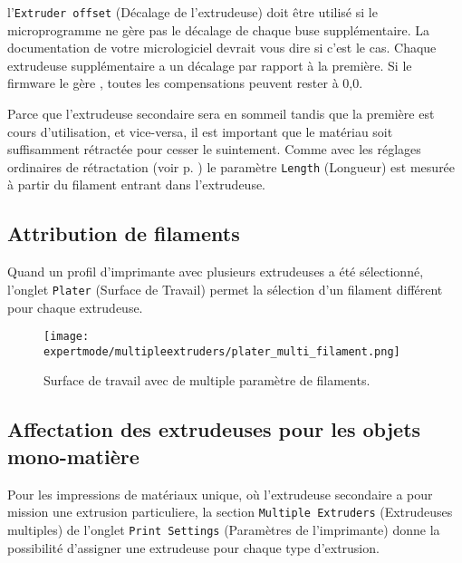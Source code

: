 
l'\texttt{Extruder offset} (Décalage de l'extrudeuse) doit être utilisé si le microprogramme ne gère pas le décalage de chaque buse supplémentaire. La documentation de votre micrologiciel devrait vous dire si c'est le cas. Chaque extrudeuse supplémentaire a un décalage par rapport à la première. Si le firmware le gère , toutes les compensations peuvent rester à 0,0.

Parce que l'extrudeuse secondaire sera en sommeil tandis que la première est cours d'utilisation, et vice-versa, il est important que le matériau soit suffisamment rétractée pour cesser le suintement.  Comme avec les réglages ordinaires de rétractation (voir p. \pageref{fig:retraction_settings}) le paramètre \texttt{Length} (Longueur) est mesurée à partir du filament entrant dans l'extrudeuse.


\subsection{Attribution de filaments} %
\label{sub:assigning_filaments}
Quand un profil d'imprimante avec plusieurs extrudeuses a été sélectionné, l'onglet \texttt{Plater} (Surface de Travail) permet la sélection d'un filament différent pour chaque extrudeuse.

\begin{figure}[H]
\centering
\texttt{[image: expertmode/multipleextruders/plater\_multi\_filament.png]}
\caption{Surface de travail avec de multiple paramètre de filaments.}
\label{fig:plater_multi_filament}
\end{figure}


\subsection{Affectation des extrudeuses pour les objets mono-matière} %
\label{sub:assigning_extruders}

Pour les impressions de matériaux unique, où l'extrudeuse secondaire a pour mission une extrusion particuliere, la section \texttt{Multiple Extruders} (Extrudeuses multiples) de l'onglet \texttt{Print Settings} (Paramètres de l'imprimante) donne la possibilité d'assigner une extrudeuse pour chaque type d'extrusion.

